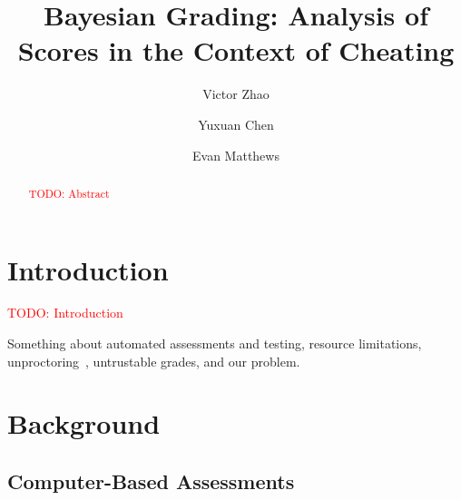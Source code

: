 \documentclass[review,sigconf]{acmart}
\newcommand{\todo}[1]{\textcolor{red}{TODO: #1}}
\begin{document}
\title[Bayesian]{Bayesian Grading: Analysis of Scores in the Context of Cheating}
\author{Victor Zhao}
\author{Yuxuan Chen}
\author{Evan Matthews}

\begin{abstract}
\todo{Abstract}
\end{abstract}

\maketitle

\section{Introduction}
\todo{Introduction}

Something about automated assessments and testing, resource limitations, unproctoring~\cite{gulati2024regimens}, untrustable grades, and our problem. 

\section{Background}
\subsection{Computer-Based Assessments}
\end{document}
